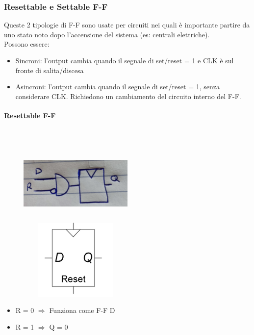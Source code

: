 \documentclass{report}
\newcommand{\subsubsubsection}[1]{\paragraph{#1}\mbox{}\\}
\begin{document}
        \subsubsection{Resettable e Settable F-F}
            Queste 2 tipologie di F-F sono usate per circuiti nei quali è importante 
            partire da uno stato noto dopo l'accensione del sistema (es: centrali elettriche). \\
            Possono essere:
            \begin{itemize}
                \item Sincroni: l'output cambia quando il segnale di set/reset = 1 e CLK è sul fronte di salita/discesa
                \item Asincroni: l'output cambia quando il segnale di set/reset = 1, senza considerare CLK. 
                    Richiedono un cambiamento del circuito interno del F-F.
            \end{itemize}
            \subsubsubsection{Resettable F-F}
                \begin{center}
                    \begin{figure}[H]
                        \includegraphics[width=0.5\textwidth, height=4cm]{flipflopr.jpg}
                        \includegraphics[width=0.5\textwidth, height=4cm]{flipflopr2.png}
                    \end{figure}
                \end{center}
                \begin{itemize}
                    \item R = 0 $\Longrightarrow$ Funziona come F-F D
                    \item R = 1 $\Longrightarrow$ Q = 0
                \end{itemize}
\end{document}
